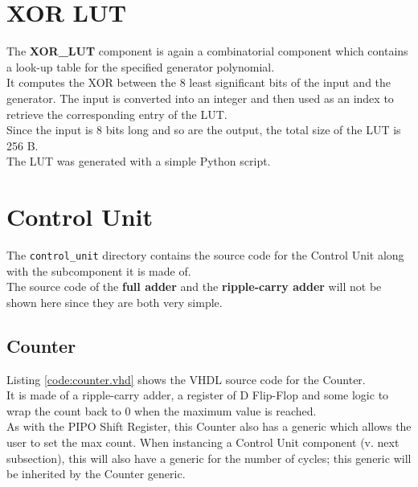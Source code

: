 \section{XOR LUT}\label{sec:XOR_LUT.vhd}
\lstset{style=codestyle}\label{code:XOR_LUT.vhd}

\hfill \break
The \textbf{XOR\_LUT} component is again a combinatorial component which contains a look-up table for the specified generator polynomial.\\
It computes the XOR between the 8 least significant bits of the input and the generator. The input is converted into an integer and then used as an index to retrieve the corresponding entry of the LUT.\\
Since the input is 8 bits long and so are the output, the total size of the LUT is 256 B.\\
The LUT was generated with a simple Python script.
\pagebreak
\section{Control Unit}\label{sec:control_unit.vhd}

\hfill \break
The \texttt{control\_unit} directory contains the source code for the Control Unit along with the subcomponent it is made of.\\
The source code of the \textbf{full adder} and the \textbf{ripple-carry adder} will not be shown here since they are both very simple.

\subsection{Counter}\label{subsec:counter.vhd}
\lstset{style=codestyle}\label{code:counter.vhd}

\hfill \break
Listing \ref{code:counter.vhd} shows the VHDL source code for the Counter.\\
It is made of a ripple-carry adder, a register of D Flip-Flop and some logic to wrap the count back to 0 when the maximum value is reached.\\
As with the PIPO Shift Register, this Counter also has a generic which allows the user to set the max count. When instancing a Control Unit component (v. next subsection), this will also have a generic for the number of cycles; this generic will be inherited by the Counter generic. %
\\
\pagebreak
